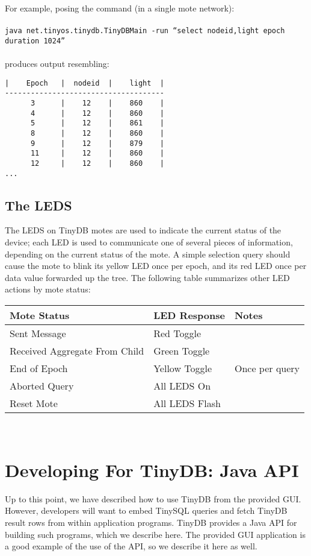 \documentclass[11pt]{article}
\begin{document}
\noindent For example, posing the command (in a single mote network):
\\
\\
{\tt java net.tinyos.tinydb.TinyDBMain -run ``select nodeid,light epoch duration 1024''}\\
\\
produces output resembling:
\\
\noindent
\begin{verbatim}
|    Epoch   |  nodeid  |    light  |
-------------------------------------
      3      |    12    |    860    |
      4      |    12    |    860    |
      5      |    12    |    861    |
      8      |    12    |    860    |
      9      |    12    |    879    |
      11     |    12    |    860    |
      12     |    12    |    860    |
...

\end{verbatim}

\subsection{The LEDS}

The LEDS on TinyDB motes are used to indicate the current status of the device;  each LED is used
to communicate one of several pieces of information, depending on the current status of the
mote.  A simple selection query should cause the mote to blink its yellow LED once per epoch, and its
red LED once per data value forwarded up the tree. The following table summarizes other
LED actions by mote status:

\vspace{.1in}
\tiny
\noindent
\begin{tabular}{|l|l|l|}
\hline
Mote Status & LED Response & Notes \\
\hline\hline
Sent Message & Red Toggle & \\
Received Aggregate From Child & Green Toggle & \\
End of Epoch & Yellow Toggle & Once per query \\
Aborted Query & All LEDS On & \\
Reset Mote & All LEDS Flash & \\
\hline
\end{tabular}
\normalsize
\\

\section{Developing For TinyDB: Java API}
\label{sec:devel}
Up to this point, we have described how to use TinyDB from the
provided GUI.  However, developers will want to embed TinySQL
queries and fetch TinyDB result rows from within application programs.
TinyDB provides a Java API for
building such programs, which we describe here.  The provided
GUI application is a good example of the use of the API,
so we describe it here as well.
\end{document}
